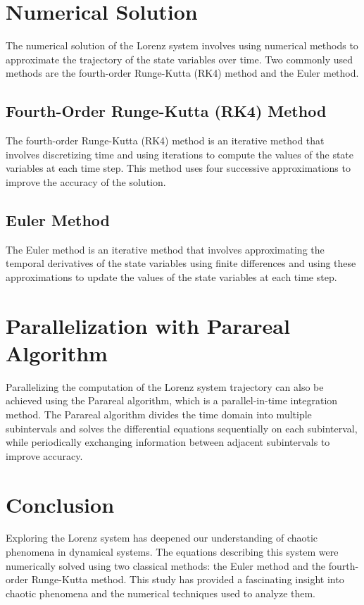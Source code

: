 \documentclass{article}
\begin{document}
\section{Numerical Solution}
The numerical solution of the Lorenz system involves using numerical methods to approximate the trajectory of the state variables over time. 
Two commonly used methods are the fourth-order Runge-Kutta (RK4) method and the Euler method.

\subsection{Fourth-Order Runge-Kutta (RK4) Method}
The fourth-order Runge-Kutta (RK4) method is an iterative method that involves discretizing 
time and using iterations to compute the values of the state variables at each time step. 
This method uses four successive approximations to improve the accuracy of the solution. 

\subsection{Euler Method}
The Euler method is an iterative method that involves approximating the temporal derivatives 
of the state variables using finite differences and using these approximations to update the values of the state variables at each time step. 

\section{Parallelization with Parareal Algorithm}
Parallelizing the computation of the Lorenz system trajectory can also be achieved using the Parareal algorithm, 
which is a parallel-in-time integration method.
The Parareal algorithm divides the time domain into multiple subintervals and solves the differential equations sequentially on each subinterval, 
while periodically exchanging information between adjacent subintervals to improve accuracy.

\section{Conclusion}
Exploring the Lorenz system has deepened our understanding of chaotic phenomena in dynamical systems. 
The equations describing this system were numerically solved using two classical methods: the Euler 
method and the fourth-order Runge-Kutta method. This study has provided a fascinating insight into 
chaotic phenomena and the numerical techniques used to analyze them.
\end{document}
